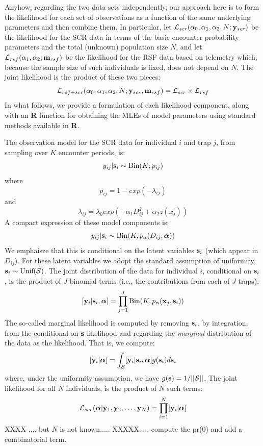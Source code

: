 Anyhow, regarding the two data sets independently, our approach here
is to form the likelihood for each set of observations as a function
of the same underlying parameters and then combine them. In
particular, let ${\cal L}_{scr}(\alpha_{0}, \alpha_{1}, \alpha_{2}, N;
{\bf y}_{scr})$
be the likelihood for the SCR data in terms of the basic encounter
probability parameters and the total (unknown) population size $N$,
and let ${\cal L}_{rsf}(\alpha_{1},\alpha_{2}; {\bf m}_{rsf})$ be the
likelihood for the RSF data based on telemetry which, because the
sample size of such individuals is fixed, does not depend on $N$.
The
joint likelihood is the product of these two pieces:
\[
{\cal L}_{rsf+scr}(\alpha_{0},\alpha_{1},\alpha_{2},N; {\bf y}_{scr},{\bf
  m}_{rsf})  = {\cal L}_{scr} \times {\cal L}_{rsf}
\]
In what follows, we provide a formulation of each likelihood
component, along with an {\bf R} function for obtaining the MLEs of
model parameters using standard methods available in {\bf R}.

The observation model for the SCR data for individual $i$ and trap $j$,
from sampling over $K$ encounter periods, is:
\[
 y_{ij}|{\bf s}_{i} \sim \mbox{Bin}(K; p_{ij})
\]
where
\[
 p_{ij} = 1-exp(- \lambda_{ij} )
\]
and
\[
 \lambda_{ij} = \lambda_{0} exp(- \alpha_{1} D_{ij}^{2} + \alpha_{2}  z(x_{j}) )
\]
A compact expression of these model components is:
\begin{equation}
y_{ij}| {\bf s}_{i} \sim \mbox{Bin}(K, p_{\alpha}(D_{ij}; {\bm \alpha}))
\label{rsf.mle.eq.cond-on-s}
\end{equation}
We emphaisze that this is conditional on the latent variables ${\bf
  s}_{i}$ (which appear in $D_{ij}$). For these latent variables we
adopt the standard assumption of uniformity, ${\bf s}_{i} \sim
\mbox{Unif}({\cal S})$.  The joint distribution of the data for
individual $i$, conditional on ${\bf s}_{i}$, is the product of $J$
binomial terms (i.e., the contributions from each of $J$ traps):
\[
  [{\bf y}_{i} | {\bf s}_{i} , {\bm \alpha}] =
  \prod_{j=1}^{J} \mbox{Bin}(K, p_{\alpha}({\bf x}_{j},{\bf s}_{i}) )
\]
The so-called marginal likelihood \citep{borchers_efford:2008} is
computed by removing ${\bf s}_{i}$, by integration, from the
conditional-on-${\bf s}$ likelihood and regarding the {\it marginal}
distribution of the data as the likelihood. That is, we compute:
\[
  [{\bf y}_{i}|{\bm \alpha}] =
\int_{{\cal S}}  [ {\bf y}_{i} |{\bf s}_{i},{\bm \alpha}] g({\bf s}_{i}) d{\bf s}_{i}
\]
{\flushleft where}, under the uniformity assumption, we have
$g({\bf s}) = 1/||{\cal S}||$.
The joint likelihood for all $N$ individuals,
is the product of $N$ such terms:
\[
{\cal L}_{scr}({\bm \alpha} | {\bf y}_{1},{\bf y}_{2},\ldots, {\bf y}_{N}) = \prod_{i=1}^{N}
[{\bf y}_{i}|{\bm \alpha}]
\]
XXXX .... but $N$ is not known..... XXXXX..... compute the pr(0) and
add a combinatorial term.

